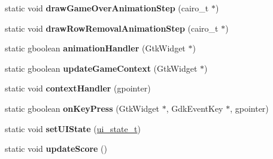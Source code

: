 \begin{DoxyCompactItemize}
static void {\bfseries draw\+Game\+Over\+Animation\+Step} (cairo\+\_\+t $\ast$)
\item 
\mbox{\label{classTetreesUI_a5db6dc449dab49c7baa83f35a7909c0c}} 
static void {\bfseries draw\+Row\+Removal\+Animation\+Step} (cairo\+\_\+t $\ast$)
\item 
\mbox{\label{classTetreesUI_a5b96d12dcb64cd2d8b76ec7feeb9e80b}} 
static gboolean {\bfseries animation\+Handler} (Gtk\+Widget $\ast$)
\item 
\mbox{\label{classTetreesUI_a80d2a8dc3841f2285eb22a5238600df7}} 
static gboolean {\bfseries update\+Game\+Context} (Gtk\+Widget $\ast$)
\item 
\mbox{\label{classTetreesUI_aecd0c6b7dad0f9524673711db8364cd6}} 
static void {\bfseries context\+Handler} (gpointer)
\item 
\mbox{\label{classTetreesUI_ad940ec71d761d3234ee3cef397434784}} 
static gboolean {\bfseries on\+Key\+Press} (Gtk\+Widget $\ast$, Gdk\+Event\+Key $\ast$, gpointer)
\item 
\mbox{\label{classTetreesUI_a195806825b5469dcc99fbca5d14af94f}} 
static void {\bfseries set\+U\+I\+State} (\mbox{\hyperlink{TetreesDefs_8hpp_ab583135648b1264a9f7817709c4dbd3e}{ui\+\_\+state\+\_\+t}})
\item 
\mbox{\label{classTetreesUI_ac41bb9dc9af1d051c54dd5f2dcf224a9}} 
static void {\bfseries update\+Score} ()
\end{DoxyCompactItemize}
